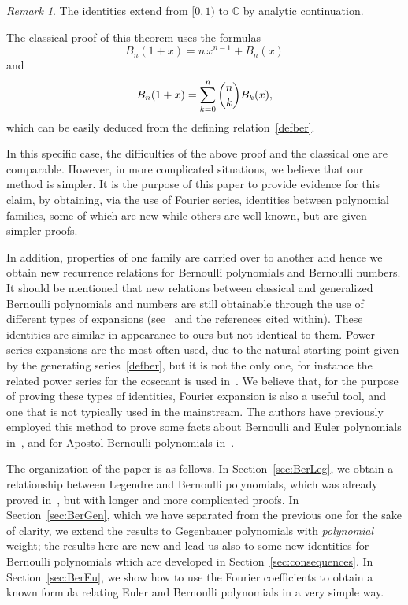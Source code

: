 \documentclass[a4paper,reqno]{amsart}
\newcommand{\C}{\mathbb{C}}
\theoremstyle{plain}
\numberwithin{equation}{section}
\theoremstyle{remark}
\newtheorem*{Nota}{Remark}
\begin{document}
\begin{Nota} 
The identities extend from $[0,1)$ to $\C$ by analytic continuation.
\end{Nota}

The classical proof of this theorem uses the formulas
\[
  B_n(1+x) = n\,x^{n-1}+B_n(x)
\]
and
\[
  B_n(1+x) = \sum_{k=0}^n \dbinom{n}{k} B_k(x),
\]
which can be easily deduced from the defining relation~\eqref{defber}. 

In this specific case, the difficulties of the above proof and the classical one are comparable. However, in more complicated situations, we believe that our method is simpler. It is the purpose of this paper to provide evidence for this claim, by obtaining, via the use of Fourier series, identities between polynomial families, some of which are new while others are well-known, but are given simpler proofs. 

In addition, properties of one family are carried over to another and hence we
obtain new recurrence relations for Bernoulli polynomials and Bernoulli numbers.
It should be mentioned that new relations between classical and generalized
Bernoulli polynomials and numbers are still obtainable through the use of
different types of expansions (see~\cite{AgDil, GesVien, LiLu, Sh} and the
references cited within). These identities are similar in appearance to ours but not identical to them. Power series expansions are the most often used, due to the natural starting point given by the generating series~\eqref{defber}, but it is not the only one, for instance the related power series for the cosecant is used in~\cite{Dil}. We believe that, for the purpose of proving these types of identities, Fourier expansion is also a useful tool, and one that is not typically used in the mainstream. The authors have previously employed this method to prove some facts about Bernoulli and Euler polynomials in~\cite{NRV}, and for Apostol-Bernoulli polynomials in~\cite{NRV-MC}.

The organization of the paper is as follows. In Section~\ref{sec:BerLeg}, we obtain a relationship between Legendre and Bernoulli polynomials, which was already proved in~\cite{VuNg-Z,VuNg-B}, but with longer and more complicated proofs. 
In Section~\ref{sec:BerGen}, which we have separated from the previous one for the sake of clarity, we extend the results to Gegenbauer polynomials with \emph{polynomial} weight; the results here are new and lead us also to some new identities for Bernoulli polynomials which are developed in Section~\ref{sec:consequences}. 
In Section~\ref{sec:BerEu}, we show how to use the Fourier coefficients to obtain a known formula relating Euler and Bernoulli polynomials in a very simple way.
\end{document}
